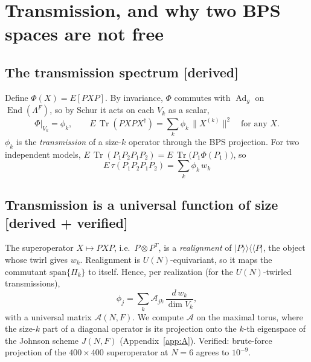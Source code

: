 \documentclass[11pt]{article}
\newcommand{\Tr}{\operatorname{Tr}}
\newcommand{\End}{\operatorname{End}}
\newcommand{\Ad}{\operatorname{Ad}}
\newcommand{\tagbox}[2]{\textsf{\small\color{#1}[#2]}}
\newcommand{\DER}{\tagbox{cder}{derived}}
\newcommand{\VER}{\tagbox{cder}{derived + verified}}
\theoremstyle{remark}
\begin{document}
\section{Transmission, and why two BPS spaces are not free}\label{sec:transmission}
\subsection{The transmission spectrum \DER}
Define $\Phi(X)=E[PXP]$. By invariance, $\Phi$ commutes with $\Ad_g$ on $\End(\Lambda^F)$, so by Schur it acts on each
$V_k$ as a scalar,
\begin{equation}
\Phi\big|_{V_k}=\phi_k,\qquad E\,\Tr(PXPX^\dagger)=\sum_k\phi_k\,\|X^{(k)}\|^2 \quad\text{for any }X .
\end{equation}
$\phi_k$ is the \emph{transmission} of a size-$k$ operator through the BPS projection. For two independent models,
$E\,\Tr(P_1P_2P_1P_2)=E\,\Tr\big(P_1\Phi(P_1)\big)$, so
\begin{equation}
\boxed{\;E\,\tau(P_1P_2P_1P_2)=\sum_k\phi_k\,w_k\;}
\label{eq:twomodel}
\end{equation}

\subsection{Transmission is a universal function of size \VER}
The superoperator $X\mapsto PXP$, i.e.\ $P\otimes P^T$, is a \emph{realignment} of $|P\rangle\rangle\langle\langle P|$,
the object whose twirl gives $w_k$. Realignment is $U(N)$-equivariant, so it maps the commutant $\mathrm{span}\{\Pi_k\}$
to itself. Hence, per realization (for the $U(N)$-twirled transmissions),
\begin{equation}
\phi_j=\sum_k\mathcal A_{jk}\,\frac{d\,w_k}{\dim V_k},
\end{equation}
with a universal matrix $\mathcal A(N,F)$. We compute $\mathcal A$ on the maximal torus, where the size-$k$ part of a
diagonal operator is its projection onto the $k$-th eigenspace of the Johnson scheme $J(N,F)$ (Appendix~\ref{app:A}).
Verified: brute-force projection of the $400\times400$ superoperator at $N=6$ agrees to $10^{-9}$.
\end{document}
